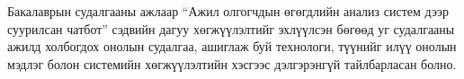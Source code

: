 
\quad Бакалаврын судалгааны ажлаар ``Ажил олгогчдын өгөгдлийн анализ систем дээр суурилсан чатбот'' сэдвийн дагуу хөгжүүлэлтийг эхлүүлсэн бөгөөд уг судалгааны ажилд холбогдох онолын судалгаа, ашиглаж буй технологи, түүнийг илүү онолын мэдлэг болон системийн хөгжүүлэлтийн хэсгээс дэлгэрэнгүй тайлбарласан болно.
